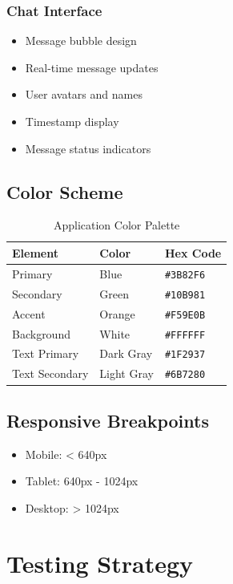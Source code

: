 \documentclass[12pt,a4paper]{article}
\begin{document}
\subsubsection{Chat Interface}
\begin{itemize}
    \item Message bubble design
    \item Real-time message updates
    \item User avatars and names
    \item Timestamp display
    \item Message status indicators
\end{itemize}

\subsection{Color Scheme}

\begin{table}[H]
\centering
\begin{tabular}{|l|l|l|}
\hline
\textbf{Element} & \textbf{Color} & \textbf{Hex Code} \\
\hline
Primary & Blue & \texttt{\#3B82F6} \\
Secondary & Green & \texttt{\#10B981} \\
Accent & Orange & \texttt{\#F59E0B} \\
Background & White & \texttt{\#FFFFFF} \\
Text Primary & Dark Gray & \texttt{\#1F2937} \\
Text Secondary & Light Gray & \texttt{\#6B7280} \\
\hline
\end{tabular}
\caption{Application Color Palette}
\end{table}

\subsection{Responsive Breakpoints}

\begin{itemize}
    \item Mobile: < 640px
    \item Tablet: 640px - 1024px
    \item Desktop: > 1024px
\end{itemize}

\newpage

\section{Testing Strategy}
\end{document}

